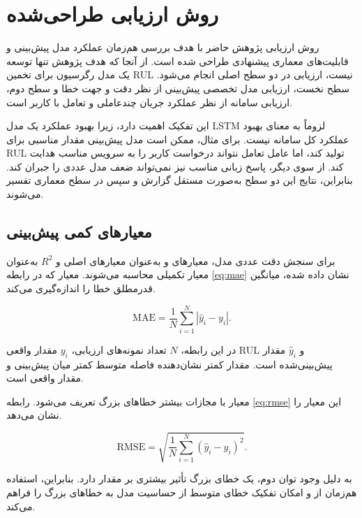 \section{روش ارزیابی طراحی‌شده}
\label{sec:eval-design}

روش ارزیابی پژوهش حاضر با هدف بررسی هم‌زمان عملکرد مدل پیش‌بینی
و قابلیت‌های معماری پیشنهادی طراحی شده است. از آنجا که هدف پژوهش
تنها توسعه یک مدل رگرسیون برای تخمین \gls{RUL} نیست، ارزیابی در
دو سطح اصلی انجام می‌شود. سطح نخست، ارزیابی مدل تخصصی پیش‌بینی از
نظر دقت و جهت خطا و سطح دوم، ارزیابی سامانه از نظر عملکرد جریان
چندعاملی و تعامل با کاربر است.

این تفکیک اهمیت دارد، زیرا بهبود عملکرد یک مدل \gls{LSTM}
لزوماً به معنای بهبود عملکرد کل سامانه نیست. برای مثال، ممکن است
مدل پیش‌بینی مقدار مناسبی برای \gls{RUL} تولید کند، اما عامل
تعامل نتواند درخواست کاربر را به سرویس مناسب هدایت کند. از سوی
دیگر، پاسخ زبانی مناسب نیز نمی‌تواند ضعف مدل عددی را جبران کند.
بنابراین، نتایج این دو سطح به‌صورت مستقل گزارش و سپس در سطح
معماری تفسیر می‌شوند.

\subsection{معیارهای کمی پیش‌بینی}
\label{sec:prediction-metrics}

برای سنجش دقت عددی مدل، معیارهای  و  به‌عنوان
معیارهای اصلی و $R^2$ به‌عنوان معیار تکمیلی محاسبه می‌شوند.
معیار  که در رابطه \ref{eq:mae} نشان داده شده، میانگین قدرمطلق خطا را اندازه‌گیری می‌کند.

\begin{equation}
	\label{eq:mae}
	\mathrm{MAE}
	=
	\frac{1}{N}
	\sum_{i=1}^{N}
	\left|
	\hat{y}_i-y_i
	\right|.
\end{equation}

در این رابطه، $N$ تعداد نمونه‌های ارزیابی، $y_i$ مقدار واقعی
\gls{RUL} و $\hat{y}_i$ مقدار پیش‌بینی‌شده است. مقدار کمتر
 نشان‌دهنده فاصله متوسط کمتر میان پیش‌بینی و مقدار واقعی
است.

معیار  با مجازات بیشتر خطاهای بزرگ تعریف می‌شود. رابطه \ref{eq:rmse} این معیار را نشان می‌دهد.

\begin{equation}
	\label{eq:rmse}
	\mathrm{RMSE}
	=
	\sqrt{
		\frac{1}{N}
		\sum_{i=1}^{N}
		(\hat{y}_i-y_i)^2
	}.
\end{equation}

به دلیل وجود توان دوم، یک خطای بزرگ تأثیر بیشتری بر مقدار
 دارد. بنابراین، استفاده هم‌زمان از 
  و
امکان تفکیک خطای متوسط از حساسیت مدل به خطاهای بزرگ را
فراهم می‌کند.

